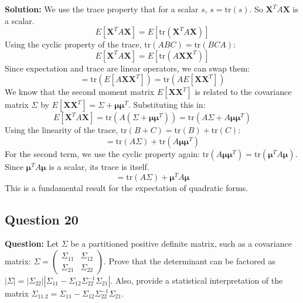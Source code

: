 \textbf{Solution:}
We use the trace property that for a scalar $s$, $s = \text{tr}(s)$. So $\mathbf{X}^T A \mathbf{X}$ is a scalar.
$$ E[\mathbf{X}^T A \mathbf{X}] = E[\text{tr}(\mathbf{X}^T A \mathbf{X})] $$
Using the cyclic property of the trace, $\text{tr}(ABC) = \text{tr}(BCA)$:
$$ E[\mathbf{X}^T A \mathbf{X}] = E[\text{tr}(A \mathbf{X}\mathbf{X}^T)] $$
Since expectation and trace are linear operators, we can swap them:
$$ = \text{tr}(E[A \mathbf{X}\mathbf{X}^T]) = \text{tr}(A E[\mathbf{X}\mathbf{X}^T]) $$
We know that the second moment matrix $E[\mathbf{X}\mathbf{X}^T]$ is related to the covariance matrix $\Sigma$ by $E[\mathbf{X}\mathbf{X}^T] = \Sigma + \boldsymbol{\mu}\boldsymbol{\mu}^T$.
Substituting this in:
$$ E[\mathbf{X}^T A \mathbf{X}] = \text{tr}(A(\Sigma + \boldsymbol{\mu}\boldsymbol{\mu}^T)) = \text{tr}(A\Sigma + A\boldsymbol{\mu}\boldsymbol{\mu}^T) $$
Using the linearity of the trace, $\text{tr}(B+C) = \text{tr}(B) + \text{tr}(C)$:
$$ = \text{tr}(A\Sigma) + \text{tr}(A\boldsymbol{\mu}\boldsymbol{\mu}^T) $$
For the second term, we use the cyclic property again: $\text{tr}(A\boldsymbol{\mu}\boldsymbol{\mu}^T) = \text{tr}(\boldsymbol{\mu}^T A \boldsymbol{\mu})$. Since $\boldsymbol{\mu}^T A \boldsymbol{\mu}$ is a scalar, its trace is itself.
$$ = \text{tr}(A\Sigma) + \boldsymbol{\mu}^T A \boldsymbol{\mu} $$
This is a fundamental result for the expectation of quadratic forms.

\subsection*{Question 20}
\textbf{Question:} Let $\Sigma$ be a partitioned positive definite matrix, such as a covariance matrix: $\Sigma = \begin{pmatrix} \Sigma_{11} & \Sigma_{12} \\ \Sigma_{21} & \Sigma_{22} \end{pmatrix}$. Prove that the determinant can be factored as $|\Sigma| = |\Sigma_{22}| |\Sigma_{11} - \Sigma_{12}\Sigma_{22}^{-1}\Sigma_{21}|$. Also, provide a statistical interpretation of the matrix $\Sigma_{11.2} = \Sigma_{11} - \Sigma_{12}\Sigma_{22}^{-1}\Sigma_{21}$.

